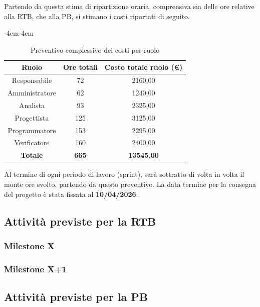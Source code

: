 \documentclass[a4paper,12pt]{article}
\begin{document}
Partendo da questa stima di ripartizione oraria, comprensiva sia delle ore relative alla RTB, che alla PB, si stimano i costi riportati di seguito.
\begin{table}[H]
    \label{tab:preventivo_complessivo}
    \begin{adjustwidth}{-4cm}{-4cm}
    \centering
    \begin{tabular}{|c|c|c|}
        \hline
        \textbf{Ruolo} & \textbf{Ore totali} & \textbf{Costo totale ruolo (€)}  \\
        \hline
        Responsabile & 72 & 2160,00 \\
        \hline
        Amministratore & 62 & 1240,00 \\
        \hline
        Analista & 93 & 2325,00 \\
        \hline
        Progettista & 125 & 3125,00 \\
        \hline
        Programmatore & 153 & 2295,00 \\
        \hline
        Verificatore & 160 & 2400,00 \\
        \hline
        \textbf{Totale} & \textbf{665} & \textbf{13545,00} \\
        \hline
    \end{tabular}
    \caption{Preventivo complessivo dei costi per ruolo}
    \end{adjustwidth}
\end{table}

Al termine di ogni periodo di lavoro (sprint), sarà sottratto di volta in volta il monte ore svolto, partendo da questo preventivo. La data termine per la consegna del progetto è stata fissata al \textbf{10/04/2026}.


\subsection{Attività previste per la RTB}

\subsubsection{Milestone X}

\subsubsection{Milestone X+1}


\subsection{Attività previste per la PB}
\end{document}
